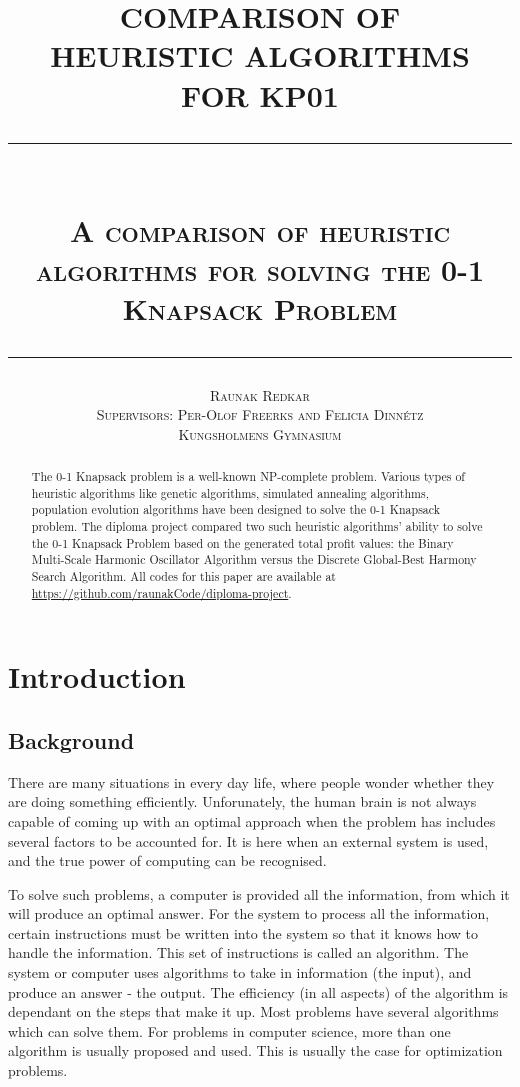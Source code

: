 \documentclass[titlepage]{article}
\title{
    \textbf{COMPARISON OF \\
    HEURISTIC ALGORITHMS \\
    FOR KP01} \\[0.5cm]
    \rule{12cm}{0.3mm} \\[0.5cm] 
    \small \scshape{A comparison of heuristic algorithms for solving the 0-1 Knapsack Problem} \\[0.4cm]
    \rule{12cm}{0.3mm}
    \vskip -0.3cm
}
\author{
    \small \scshape{Raunak Redkar} \\ 
    \small \scshape{Supervisors: Per-Olof Freerks and Felicia Dinnétz} \\
    \scriptsize \scshape{Kungsholmens Gymnasium}
}
\begin{document}
\renewcommand{\arraystretch}{1.5}

\onehalfspacing

\maketitle

\newpage

\begin{abstract}
    The 0-1 Knapsack problem is a well-known NP-complete problem. Various types of heuristic algorithms like genetic algorithms, simulated annealing algorithms, population evolution algorithms have been designed to solve the 0-1 Knapsack problem. The diploma project compared two such heuristic algorithms' ability to solve the 0-1 Knapsack Problem based on the generated total profit values: the Binary Multi-Scale Harmonic Oscillator Algorithm versus the Discrete Global-Best Harmony Search Algorithm. All codes for this paper are available at \href{github.com/raunakCode}{https://github.com/raunakCode/diploma-project}.
\end{abstract}

\newpage


\tableofcontents
\listofalgorithms
\newpage

\section{Introduction}

\subsection{Background}

\renewcommand{\familydefault}{Computer Modern}
There are many situations in every day life, where people wonder whether they are doing something efficiently. Unforunately, the human brain is not always capable of coming up with an optimal approach when the problem has includes several factors to be accounted for. It is here when an external system is used, and the true power of computing can be recognised. 

To solve such problems, a computer is provided all the information, from which it will produce an optimal answer. For the system to process all the information, certain instructions must be written into the system so that it knows how to handle the information. This set of instructions is called an algorithm. The system or computer uses algorithms to take in information (the input), and produce an answer - the output. The efficiency (in all aspects) of the algorithm is dependant on the steps that make it up. Most problems have several algorithms which can solve them. For problems in computer science, more than one algorithm is usually proposed and used. This is usually the case for optimization problems. 
\end{document}
